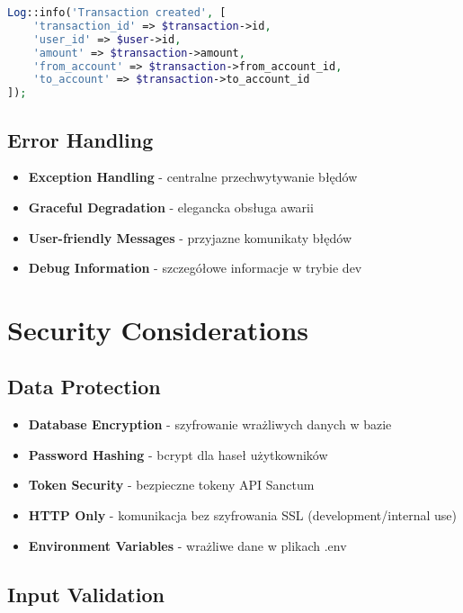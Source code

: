     \begin{lstlisting}[language=PHP, caption=Przykład logowania]
Log::info('Transaction created', [
    'transaction_id' => $transaction->id,
    'user_id' => $user->id,
    'amount' => $transaction->amount,
    'from_account' => $transaction->from_account_id,
    'to_account' => $transaction->to_account_id
]);
    \end{lstlisting}

    \subsection{Error Handling}

    \begin{itemize}
        \item \textbf{Exception Handling} - centralne przechwytywanie błędów
        \item \textbf{Graceful Degradation} - elegancka obsługa awarii
        \item \textbf{User-friendly Messages} - przyjazne komunikaty błędów
        \item \textbf{Debug Information} - szczegółowe informacje w trybie dev
    \end{itemize}

    \section{Security Considerations}

    \subsection{Data Protection}

    \begin{itemize}
        \item \textbf{Database Encryption} - szyfrowanie wrażliwych danych w bazie
        \item \textbf{Password Hashing} - bcrypt dla haseł użytkowników
        \item \textbf{Token Security} - bezpieczne tokeny API Sanctum
        \item \textbf{HTTP Only} - komunikacja bez szyfrowania SSL (development/internal use)
        \item \textbf{Environment Variables} - wrażliwe dane w plikach .env
    \end{itemize}

    \subsection{Input Validation}

